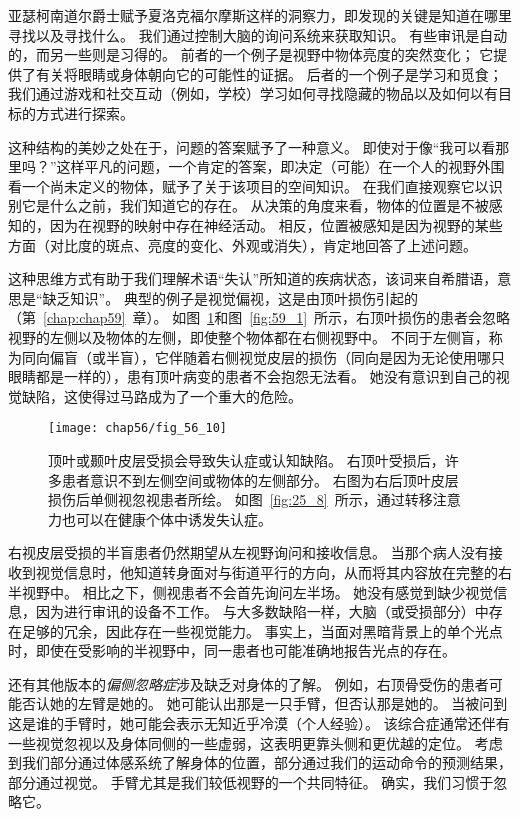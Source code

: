 亚瑟柯南道尔爵士赋予夏洛克福尔摩斯这样的洞察力，即发现的关键是知道在哪里寻找以及寻找什么。
我们通过控制大脑的询问系统来获取知识。
有些审讯是自动的，而另一些则是习得的。
前者的一个例子是视野中物体亮度的突然变化；
它提供了有关将眼睛或身体朝向它的可能性的证据。
后者的一个例子是学习和觅食；
我们通过游戏和社交互动（例如，学校）学习如何寻找隐藏的物品以及如何以有目标的方式进行探索。


这种结构的美妙之处在于，问题的答案赋予了一种意义。
即使对于像“我可以看那里吗？”这样平凡的问题，一个肯定的答案，即决定（可能）在一个人的视野外围看一个尚未定义的物体，赋予了关于该项目的空间知识。
在我们直接观察它以识别它是什么之前，我们知道它的存在。
从决策的角度来看，物体的位置是不被感知的，因为在视野的映射中存在神经活动。
相反，位置被感知是因为视野的某些方面（对比度的斑点、亮度的变化、外观或消失），肯定地回答了上述问题。


这种思维方式有助于我们理解术语“失认”所知道的疾病状态，该词来自希腊语，意思是“缺乏知识”。
典型的例子是视觉偏视，这是由顶叶损伤引起的（第~\ref{chap:chap59}~章）。
如图~\ref{fig:56_10}和图~\ref{fig:59_1}~所示，右顶叶损伤的患者会忽略视野的左侧以及物体的左侧，即使整个物体都在右侧视野中。
不同于左侧盲，称为同向偏盲（或半盲），它伴随着右侧视觉皮层的损伤（同向是因为无论使用哪只眼睛都是一样的），患有顶叶病变的患者不会抱怨无法看。
她没有意识到自己的视觉缺陷，这使得过马路成为了一个重大的危险。


\begin{figure}[htbp]
	\centering
	\texttt{[image: chap56/fig\_56\_10]}
	\caption{顶叶或颞叶皮层受损会导致失认症或认知缺陷。
		右顶叶受损后，许多患者意识不到左侧空间或物体的左侧部分。
		右图为右后顶叶皮层损伤后单侧视忽视患者所绘。
		如图~\ref{fig:25_8}~所示，通过转移注意力也可以在健康个体中诱发失认症。}
	\label{fig:56_10}
\end{figure}


右视皮层受损的半盲患者仍然期望从左视野询问和接收信息。
当那个病人没有接收到视觉信息时，他知道转身面对与街道平行的方向，从而将其内容放在完整的右半视野中。
相比之下，侧视患者不会首先询问左半场。
她没有感觉到缺少视觉信息，因为进行审讯的设备不工作。
与大多数缺陷一样，大脑（或受损部分）中存在足够的冗余，因此存在一些视觉能力。
事实上，当面对黑暗背景上的单个光点时，即使在受影响的半视野中，同一患者也可能准确地报告光点的存在。


还有其他版本的\textit{偏侧忽略症}涉及缺乏对身体的了解。
例如，右顶骨受伤的患者可能否认她的左臂是她的。
她可能认出那是一只手臂，但否认那是她的。
当被问到这是谁的手臂时，她可能会表示无知近乎冷漠（个人经验）。
该综合症通常还伴有一些视觉忽视以及身体同侧的一些虚弱，这表明更靠头侧和更优越的定位。
考虑到我们部分通过体感系统了解身体的位置，部分通过我们的运动命令的预测结果，部分通过视觉。
手臂尤其是我们较低视野的一个共同特征。
确实，我们习惯于忽略它。


